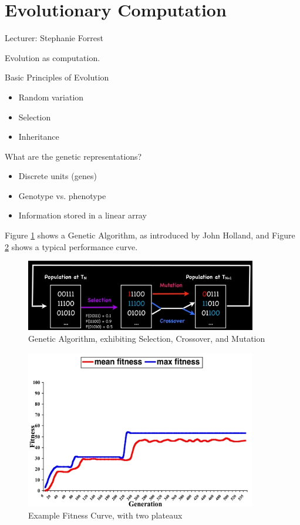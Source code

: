 \documentclass[]{article}
\begin{document}
\section{Evolutionary Computation}

Lecturer: Stephanie Forrest

Evolution as computation.

Basic Principles of Evolution
\begin{itemize}
	\item Random variation
	\item Selection
	\item Inheritance
\end{itemize}

What are the genetic representations?
\begin{itemize}
	\item  Discrete units (genes)
	\item Genotype vs. phenotype
	\item Information stored in a linear array
\end{itemize}

Figure \ref{fig:GeneticAlgorithm} shows a Genetic Algorithm, as introduced by John Holland\cite{holland1992adaptation}, and Figure \ref{fig:GAfitness} shows a typical performance curve.

\begin{figure}
	\caption{Genetic Algorithm, exhibiting Selection, Crossover, and Mutation}\label{fig:GeneticAlgorithm}
	\includegraphics[width=0.9\textwidth]{GeneticAlgorithm}
\end{figure}

\begin{figure}
	\caption{Example Fitness Curve, with two plateaux}\label{fig:GAfitness}
	\includegraphics[width=0.9\textwidth]{GAfitness}
\end{figure}
\end{document}
